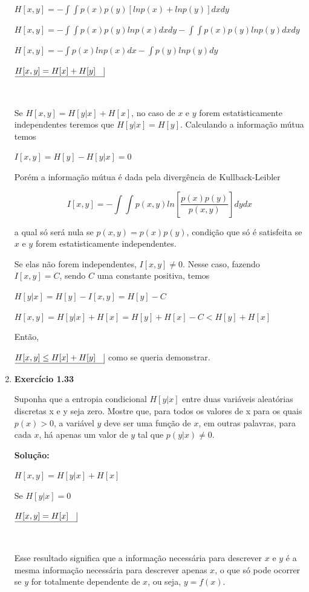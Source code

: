 \begin{enumerate}
$H[x,y] = \displaystyle - \int \int p(x)p(y) [ln p(x) + ln p(y)] dx dy$

$H[x,y] = \displaystyle - \int \int p(x)p(y) ln p(x) dx dy - \int \int p(x)p(y) ln p(y) dx dy$

$H[x,y] = \displaystyle - \int p(x) ln p(x) dx - \int p(y) ln p(y) dy$

$\underline{H[x,y] = H[x] + H[y] \quad} \vline$

$ $

Se $H[x,y] = H[y|x] + H[x]$, no caso de $x$ e $y$ forem estatisticamente independentes teremos que $H[y|x] = H[y]$. Calculando a informação mútua temos

$I[x,y] = H[y]-H[y|x] = 0$

Porém a informação mútua é dada pela divergência de Kullback-Leibler 

$$I[x,y] = \displaystyle - \int \int p(x,y) ln\left[ \dfrac{p(x)p(y)}{p(x,y)}  \right] dy dx $$ 

a qual só será nula se $p(x,y) = p(x)p(y)$, condição que só é satisfeita se $x$ e $y$ forem estatisticamente independentes.

Se elas não forem independentes, $I[x,y] \neq 0$. Nesse caso, fazendo $I[x,y] = C$, sendo $C$ uma constante positiva, temos

$H[y|x] = H[y] - I[x,y] = H[y] - C$

$H[x,y] = H[y|x] + H[x] = H[y] + H[x] - C < H[y] + H[x]$

Então, 

$\underline{H[x,y] \leq H[x] + H[y] \quad} \vline$ como se queria demonstrar.



\item \textbf{Exercício 1.33} \par

Suponha que a entropia condicional $H[y|x]$ entre duas variáveis aleatórias discretas x e y seja zero. Mostre que, para todos os valores de x para os quais $p(x) > 0$, a variável $y$ deve ser uma função de $x$, em outras palavras, para cada $x$, há apenas um valor de $y$ tal que $p(y|x) \neq 0$.
\newline \par
\textbf{Solução:}

$H[x,y] = H[y|x] + H[x]$

Se $H[y|x]=0$ 

$\underline{H[x,y] = H[x] \quad} \vline$

$ $

Esse resultado significa que a informação necessária para descrever $x$ e $y$ é a mesma informação necessária para descrever apenas $x$, o que só pode ocorrer se $y$ for totalmente dependente de $x$, ou seja, $y=f(x)$.


\end{enumerate}
